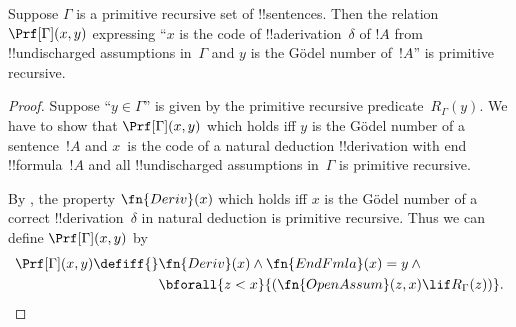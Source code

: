 \documentclass[../../../include/open-logic-section]{subfiles}
\begin{document}
\begin{prop}
  Suppose $\Gamma$ is a primitive recursive set of !!{sentence}s.
  Then the relation $\Prf[\Gamma](x, y)$ expressing ``$x$ is the code
  of !!a{derivation}~$\delta$ of $!A$ from !!{undischarged}
  assumptions in~$\Gamma$ and $y$ is the G\"odel number of~$!A$'' is
  primitive recursive.
\end{prop}

\begin{proof}
  Suppose ``$y \in \Gamma$'' is given by the primitive recursive
  predicate~$R_\Gamma(y)$.  We have to show that $\Prf[\Gamma](x, y)$
  which holds iff $y$ is the G\"odel number of a sentence~$!A$ and
  $x$~is the code of a natural deduction !!{derivation} with end
  !!{formula}~$!A$ and all !!{undischarged} assumptions in~$\Gamma$ is
  primitive recursive.

  By , the property $\fn{Deriv}(x)$ which holds iff
  $x$ is the G\"odel number of a correct !!{derivation}~$\delta$ in
  natural deduction is primitive recursive. Thus we can define
  $\Prf[\Gamma](x, y)$ by
  \begin{align*}
    \Prf[\Gamma](x, y) \defiff {}
    & \fn{Deriv}(x) \land \fn{EndFmla}(x) = y \land {} \\
    & \bforall{z < x}{(\fn{OpenAssum}(z, x) \lif R_\Gamma(z))}.
  \end{align*}
\end{proof}
\end{document}
